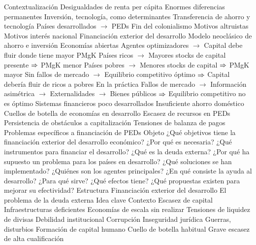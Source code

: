 \documentclass{nuevotema}
\begin{document}
\esquemalargo

\begin{esquemal}
	\1[] 
		\2 Contextualización
			\3 Desigualdades de renta per cápita
				\4 Enormes diferencias permanentes
				\4 Inversión, tecnología, como determinantes
			\3 Transferencia de ahorro y tecnología
				\4 Países desarrollados $\to$ PEDs
				\4 Fin del colonialismo
				\4 Motivos altruistas
				\4 Motivos interés nacional
			\3 Financiación exterior del desarrollo
				\4 Modelo neoclásico de ahorro e inversión
				\4[] Economías abiertas
				\4[] Agentes optimizadores
				\4[] $\to$ Capital debe fluir donde tiene mayor PMgK
				\4[] Países ricos
				\4[] $\to$ Mayores stocks de capital presente
				\4[] $\then$ PMgK menor
				\4[] Países pobres
				\4[] $\to$ Menores stocks de capital
				\4[] $\then$ PMgK mayor
				\4[] Sin fallos de mercado
				\4[] $\to$ Equilibrio competitivo óptimo
				\4[] $\then$ Capital debería fluir de ricos a pobres
				\4 En la práctica
				\4[] Fallos de mercado
				\4[] $\to$ Información asimétrica
				\4[] $\to$ Externalidades
				\4[] $\to$ Bienes públicos
				\4[] $\then$ Equilibrio competitivo no es óptimo
				\4[] Sistemas financieros poco desarrollados
				\4[] Insuficiente ahorro doméstico
				\4[] Cuellos de botella de economías en desarrollo
				\4[$\then$] Escasez de recursos en PEDs
				\4[$\then$] Persistencia de obstáculos a capitalización
				\4[$\then$] Tensiones de balanza de pagos
				\4[$\then$] Problemas específicos a financiación de PEDs
		\2 Objeto
			\3 ¿Qué objetivos tiene la financiación exterior del desarrollo económico?
			\3 ¿Por qué es necesaria?
			\3 ¿Qué instrumentos para financiar el desarrollo?
			\3 ¿Qué es la deuda externa?
			\3 ¿Por qué ha supuesto un problema para los países en desarrollo?
			\3 ¿Qué soluciones se han implementado?
			\3 ¿Quiénes son los agentes principales?
			\3 ¿En qué consiste la ayuda al desarrollo?
			\3 ¿Para qué sirve?
			\3 ¿Qué efectos tiene?
			\3 ¿Qué propuestas existen para mejorar su efectividad?
		\2 Estructura
			\3 Financiación exterior del desarrollo
			\3 El problema de la deuda externa
	\1 
		\2 Idea clave
			\3 Contexto
				\4 Escasez de capital
				\4[] Infraestructuras deficientes
				\4[] Economías de escala sin realizar
				\4[] Tensiones de liquidez de divisas
				\4 Debilidad institucional
				\4[] Corrupción
				\4[] Inseguridad jurídica
				\4[] Guerras, disturbios
				\4 Formación de capital humano
				\4[] Cuello de botella habitual
				\4[] Grave escasez de alta cualificación

\end{esquemal}
\end{document}
